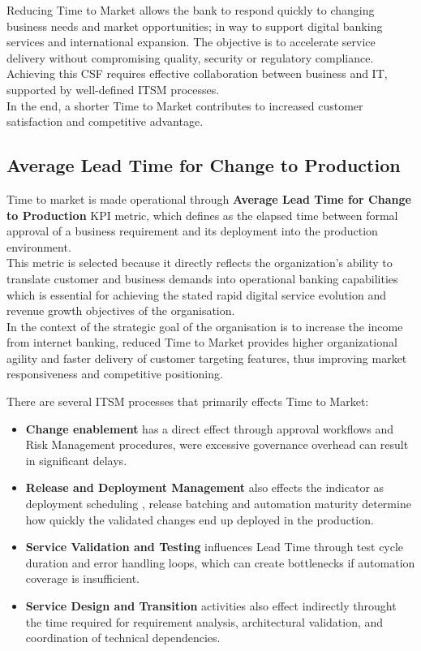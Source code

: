Reducing Time to Market allows the bank to respond quickly to changing business needs and market opportunities; in way to support digital banking services and international expansion. The objective is to accelerate service delivery without compromising quality, security or regulatory compliance.\\
Achieving this CSF requires effective collaboration between business and IT, supported by well-defined ITSM processes. \\
In the end, a shorter Time to Market contributes to increased customer satisfaction and competitive advantage.



\subsection{Average Lead Time for Change to Production}
\label{sub:AverageLeadTime}
Time to market is made operational through \textbf{Average Lead Time for Change to Production} KPI metric, which defines as the elapsed time between formal approval of a business requirement and its deployment into the production environment. \\
This metric is selected because it directly reflects the organization's ability to translate customer and business demands into operational banking capabilities which is essential for achieving the stated rapid digital service evolution and revenue growth objectives of the organisation.\\ 
In the context of the strategic goal of the organisation is to increase the income from internet banking, reduced Time to Market provides higher organizational agility and faster delivery of customer targeting features, thus improving market responsiveness and competitive positioning.

There are several ITSM processes that primarily effects Time to Market:

\begin{itemize}
    \item \textbf{Change enablement} has a direct effect through approval workflows and Risk Management procedures, were excessive governance overhead can result in significant delays.
    \item \textbf{Release and Deployment Management} also effects the indicator  as deployment scheduling , release batching and automation maturity determine how quickly the validated changes end up deployed in the production.
    \item \textbf{Service Validation and Testing} influences Lead Time through test cycle duration and error handling loops, which can create bottlenecks if automation coverage is insufficient.
    \item \textbf{Service Design and Transition} activities also effect indirectly throught the time required for requirement analysis, architectural validation, and coordination of technical dependencies.
\end{itemize}

